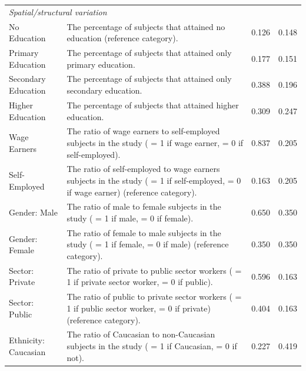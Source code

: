 \begin{singlespace}
\begin{scriptsize}
\begin{longtable}{
@{\hskip\tabcolsep\extracolsep\fill}
l
p{0.55\hsize}
cc
@{}
}
\multicolumn{4}{l}{\emph{Spatial/structural variation}}\\
           No Education &                                                                              The percentage of subjects that attained no education (reference category). &    0.126 &  0.148 \\
      Primary Education &                                                                                         The percentage of subjects that attained only primary education. &    0.177 &  0.151 \\
    Secondary Education &                                                                                       The percentage of subjects that attained only secondary education. &    0.388 &  0.196 \\
       Higher Education &                                                                                   The percentage of subjects that attained higher education. &    0.309 &  0.247 \\
           Wage Earners &                                            The ratio of wage earners to self-employed subjects in the study ( = 1 if wage earner, = 0 if self-employed). &    0.837 &  0.205 \\
          Self-Employed &                       The ratio of self-employed to wage earners subjects in the study ( = 1 if self-employed, = 0 if wage earner) (reference category). &    0.163 &  0.205 \\
           Gender: Male &                                                                         The ratio of male to female subjects in the study ( = 1 if male, = 0 if female). &    0.650 &  0.350 \\
         Gender: Female &                                                    The ratio of female to male subjects in the study ( = 1 if female, = 0 if male) (reference category). &    0.350 &  0.350 \\
        Sector: Private &                                                            The ratio of private to public sector workers ( = 1 if private sector worker, = 0 if public). &    0.596 &  0.163 \\
         Sector: Public &                                       The ratio of public to private sector workers ( = 1 if public sector worker, = 0 if private) (reference category). &    0.404 &  0.163 \\
   Ethnicity: Caucasian &                                                           The ratio of Caucasian to non-Caucasian subjects in the study ( = 1 if Caucasian, = 0 if not). &    0.227 &  0.419 \\

\end{longtable}
\end{scriptsize}
\end{singlespace}
